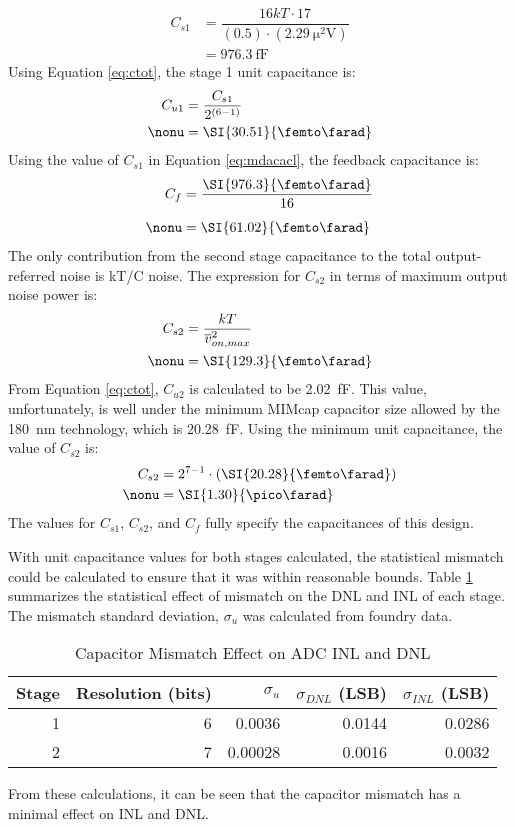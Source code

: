\begin{align}
\label{eq:cs1size}
C_{s1} &= \dfrac{16kT\cdot 17}{(0.5)\cdot(\SI{2.29}{\square\micro\volt})} \\[0.5em]
\nonumber	&= \SI{976.3}{\femto\farad}
\end{align}
Using Equation \ref{eq:ctot}, the stage 1 unit capacitance is:
\begin{align}
\label{eq:cu1size}
C_{u1} &= \dfrac{C_{s1}}{2^{(6-1)}}\\
\nonu	&= \SI{30.51}{\femto\farad}
\end{align}
Using the value of $C_{s1}$ in Equation \ref{eq:mdacacl}, the feedback capacitance is:
\begin{align}
C_{f} &= \dfrac{\SI{976.3}{\femto\farad}}{16} \\[0.5em]
\nonu &= \SI{61.02}{\femto\farad}
\end{align}
The only contribution from the second stage capacitance to the total output-referred noise is kT/C noise. The expression for $C_{s2}$ in terms of maximum output noise power is:
\begin{align}
\label{eq:cs2sizetemp}
C_{s2} &= \dfrac{kT}{\overline{v}_{on,max}^2} \\
\nonu &= \SI{129.3}{\femto\farad}
\end{align}
From Equation \ref{eq:ctot}, $C_{u2}$ is calculated to be \SI{2.02}{\femto\farad}. This value, unfortunately, is well under the minimum MIMcap capacitor size allowed by the \SI{180}{\nano\meter} technology, which is \SI{20.28}{\femto\farad}. Using the minimum unit capacitance, the value of $C_{s2}$ is:
\begin{align}
\label{eq:cu2size}
C_{s2} &= 2^{7-1}\cdot(\SI{20.28}{\femto\farad}) \\
\nonu	&= \SI{1.30}{\pico\farad}
\end{align}
The values for $C_{s1}$, $C_{s2}$, and $C_{f}$ fully specify the capacitances of this design.

With unit capacitance values for both stages calculated, the statistical mismatch could be calculated to ensure that it was within reasonable bounds. Table \ref{tab:capmismatch} summarizes the statistical effect of mismatch on the DNL and INL of each stage. The mismatch standard deviation, $\sigma_{u}$ was calculated from foundry data.
\begin{table}[htbp]
\centering
\begin{tabular}{|r|r|r|r|r|}
\hline
Stage & Resolution (bits) & $\sigma_{u}$ & $\sigma_{DNL}$ (LSB) & $\sigma_{INL}$ (LSB) \\ \hline
1 & 6 & 0.0036 & 0.0144 & 0.0286 \\ \hline
2 & 7 & 0.00028 & 0.0016 & 0.0032 \\ \hline
\end{tabular}
\caption{Capacitor Mismatch Effect on ADC INL and DNL}
\label{tab:capmismatch}
\end{table}
From these calculations, it can be seen that the capacitor mismatch has a minimal effect on INL and DNL.
